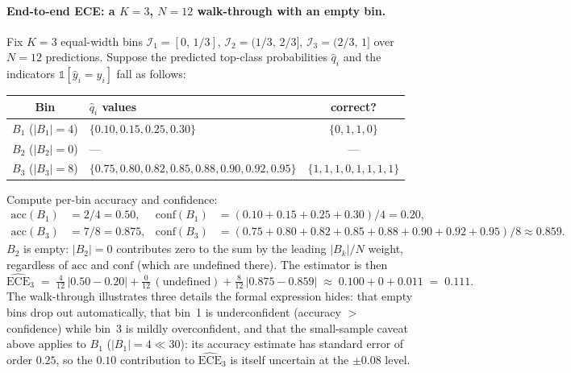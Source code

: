 \paragraph{End-to-end ECE: a $K=3$, $N=12$ walk-through with an
empty bin.}
\begin{workedexample}
Fix $K = 3$ equal-width bins
$\mathcal{I}_1 = [0,\,1/3]$, $\mathcal{I}_2 = (1/3,\,2/3]$,
$\mathcal{I}_3 = (2/3,\,1]$ over $N=12$ predictions. Suppose the
predicted top-class probabilities $\hat q_i$ and the indicators
$\mathbb{1}[\hat y_i = y_i]$ fall as follows:
\begin{center}
\small
\begin{tabular}{|c|l|c|}
\hline
Bin & $\hat q_i$ values & correct? \\
\hline
$B_1$ ($|B_1|=4$) & $\{0.10, 0.15, 0.25, 0.30\}$ & $\{0,1,1,0\}$ \\
$B_2$ ($|B_2|=0$) & --- & --- \\
$B_3$ ($|B_3|=8$) & $\{0.75, 0.80, 0.82, 0.85, 0.88, 0.90, 0.92, 0.95\}$ & $\{1,1,1,0,1,1,1,1\}$ \\
\hline
\end{tabular}
\end{center}
Compute per-bin accuracy and confidence:
\begin{align*}
\mathrm{acc}(B_1) &= 2/4 = 0.50, &
\mathrm{conf}(B_1) &= (0.10+0.15+0.25+0.30)/4 = 0.20, \\
\mathrm{acc}(B_3) &= 7/8 = 0.875, &
\mathrm{conf}(B_3) &= (0.75+0.80+0.82+0.85+0.88+0.90+0.92+0.95)/8 \approx 0.859.
\end{align*}
$B_2$ is empty: $|B_2| = 0$ contributes zero to the sum by the
leading $|B_k|/N$ weight, regardless of $\mathrm{acc}$ and
$\mathrm{conf}$ (which are undefined there). The estimator is then
\[
\widehat{\mathrm{ECE}}_3
  \;=\; \tfrac{4}{12}\,|0.50 - 0.20|
        + \tfrac{0}{12}\,(\text{undefined})
        + \tfrac{8}{12}\,|0.875 - 0.859|
  \;\approx\; 0.100 + 0 + 0.011
  \;=\; 0.111.
\]
The walk-through illustrates three details the formal expression
hides: that empty bins drop out automatically, that bin~1 is
underconfident (accuracy $>$ confidence) while bin~3 is mildly
overconfident, and that the small-sample caveat above applies to
$B_1$ ($|B_1|=4 \ll 30$): its accuracy estimate has standard error
of order $0.25$, so the $0.10$ contribution to $\widehat{\mathrm{ECE}}_3$
is itself uncertain at the $\pm 0.08$ level.
\end{workedexample}


